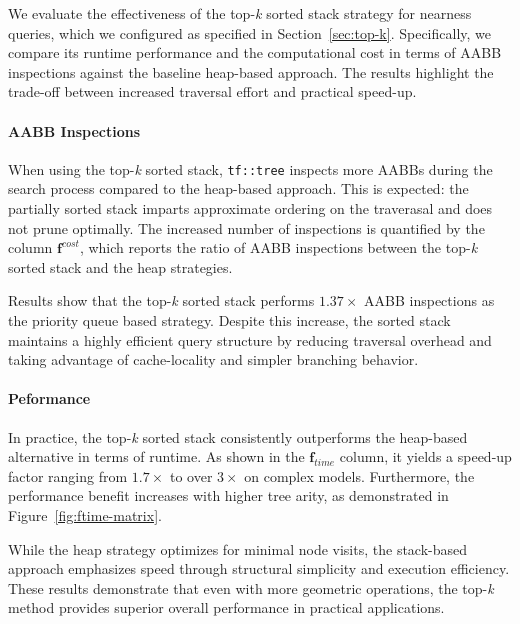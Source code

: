 We evaluate the effectiveness of the top-\emph{k}
sorted stack strategy for nearness queries, which we configured
as specified in Section~\ref{sec:top-k}. Specifically, we compare
its runtime performance and the computational cost in terms of AABB
inspections against the baseline heap-based approach. The results
highlight the trade-off between increased traversal effort and
practical speed-up.




\paragraph*{AABB Inspections}

When using the top-\emph{k} sorted stack, \texttt{tf::tree} inspects
more AABBs during the search process compared to the heap-based
approach. This is expected: the partially sorted stack imparts approximate
ordering on the traverasal and does not prune optimally.
The increased number of inspections is quantified by the column
$\mathbf{f}^{\mathit{cost}}$, which reports the ratio of AABB
inspections between the top-\emph{k} sorted stack and the heap strategies.

Results show that the top-\emph{k} sorted stack performs $1.37\times$
AABB inspections as the priority queue based strategy.
Despite this increase, the sorted stack maintains a highly efficient
query structure by reducing traversal overhead and taking advantage
of cache-locality and simpler branching behavior.

\paragraph*{Peformance}

In practice, the top-\emph{k} sorted stack consistently outperforms
the heap-based alternative in terms of runtime. As shown in the
$\mathbf{f}_{\mathit{time}}$ column, it yields a speed-up factor
ranging from $1.7\times$ to over $3\times$ on complex models.
Furthermore, the performance benefit increases with
higher tree arity, as demonstrated in Figure~\ref{fig:ftime-matrix}.

While the heap strategy optimizes for minimal node visits, the
stack-based approach emphasizes speed through structural simplicity
and execution efficiency. These results demonstrate that even with
more geometric operations, the top-\emph{k} method provides
superior overall performance in practical applications.
